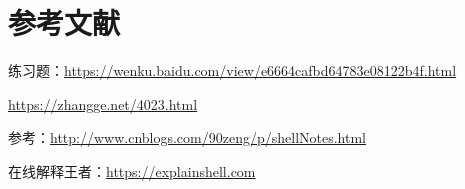\documentclass[UTF8,a4paper,12pt]{ctexbook}
\begin{document}
		\subparagraph{}
		
		\subparagraph{}	
		
		\subparagraph{}
		
		
\chapter{参考文献}
	
		 练习题：\url{https://wenku.baidu.com/view/e6664cafbd64783e08122b4f.html}
		 
			 \url{https://zhangge.net/4023.html}
			 
			 参考：\url{http://www.cnblogs.com/90zeng/p/shellNotes.html}
			 
		在线解释王者：\url{https://explainshell.com}	    
\end{document}
